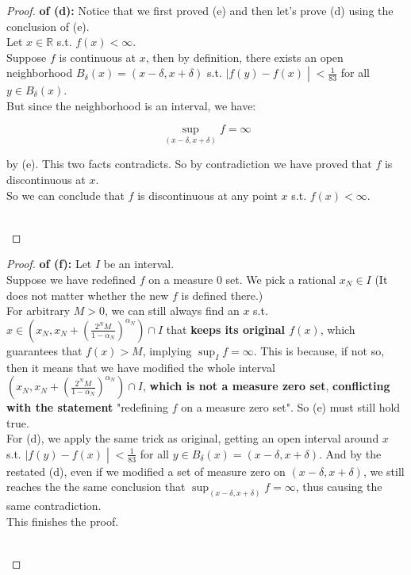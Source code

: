 \begin{proof}

\textbf{of (d):} Notice that we first proved (e) and then let's prove (d) using the conclusion of (e).\\
Let \(x \in \mathbb{R}\) s.t. \(f(x) < \infty\).\\
Suppose \(f\) is continuous at \(x\), then by definition, there exists an open neighborhood \(B_{\delta}(x) = (x - \delta,x + \delta)\) s.t. \(\left. |f(y) - f(x) \middle| < \frac{1}{83} \right.\) for all \(y \in B_{\delta}(x)\).\\
But since the neighborhood is an interval, we have:

\[\sup\limits_{(x - \delta,x + \delta)}f = \infty\]

by (e). This two facts contradicts. So by contradiction we have proved that \(f\) is discontinuous at \(x\).\\
So we can conclude that \(f\) is discontinuous at any point \(x\) s.t. \(f(x) < \infty\).\\
\strut \\

\end{proof}

\begin{proof}

\textbf{of (f):} Let \(I\) be an interval.\\
Suppose we have redefined \(f\) on a measure \(0\) set. We pick a rational \(x_{N} \in I\) (It does not matter whether the new \(f\) is defined there.)\\
For arbitrary \(M > 0\), we can still always find an \(x\) s.t. \(x \in (x_{N},x_{N} + (\frac{2^{N}M}{1 - \alpha_{N}})^{\alpha_{N}}) \cap I\) that \textbf{keeps its original \(f(x)\)}, which guarantees that \(f(x) > M\), implying \(\sup_{I}f = \infty\). This is because, if not so, then it means that we have modified the whole interval \((x_{N},x_{N} + (\frac{2^{N}M}{1 - \alpha_{N}})^{\alpha_{N}}) \cap I\), \textbf{which is not a measure zero set}, \textbf{conflicting with the statement} "redefining \(f\) on a measure zero set". So (e) must still hold true.\\
For (d), we apply the same trick as original, getting an open interval around \(x\) s.t. \(\left. |f(y) - f(x) \middle| < \frac{1}{83} \right.\) for all \(y \in B_{\delta}(x) = (x - \delta,x + \delta)\). And by the restated (d), even if we modified a set of measure zero on \((x - \delta,x + \delta)\), we still reaches the the same conclusion that \(\sup_{(x - \delta,x + \delta)}f = \infty\), thus causing the same contradiction.\\
This finishes the proof.\\
\strut \\

\end{proof}


